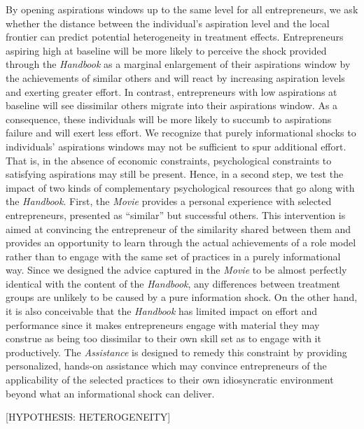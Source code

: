 \documentclass[11.5pt]{article}
\begin{document}
By opening aspirations windows up to the same level for all entrepreneurs, we ask whether the distance between the individual's aspiration level and the local frontier can predict potential heterogeneity in treatment effects. Entrepreneurs aspiring high at baseline will be more likely to perceive the shock provided through the \emph{Handbook} as a marginal enlargement of their aspirations window by the achievements of similar others and will react by increasing aspiration levels and exerting greater effort. In contrast, entrepreneurs with low aspirations at baseline will see dissimilar others migrate into their aspirations window. As a consequence, these individuals will be more likely to succumb to aspirations failure and will exert less effort. We recognize that purely informational shocks to individuals' aspirations windows may not be sufficient to spur additional effort. That is, in the absence of  economic constraints, psychological constraints to satisfying aspirations may still be present. Hence, in a second step, we test the impact of two kinds of complementary psychological resources that go along with the \emph{Handbook}. First, the \emph{Movie} provides a personal experience with selected entrepreneurs, presented as ``similar'' but successful others. This intervention is aimed at convincing the entrepreneur of the similarity shared between them and provides an opportunity to learn through the actual achievements of a role model rather than to engage with the same set of practices in a purely informational way. Since we designed the advice captured in the \emph{Movie} to be almost perfectly identical with the content of the \emph{Handbook}, any differences between treatment groups are unlikely to be caused by a pure information shock. On the other hand, it is also conceivable that the \emph{Handbook} has limited impact on effort and performance since it makes entrepreneurs engage with material they may construe as being too dissimilar to their own skill set as to engage with it productively. The \emph{Assistance} is designed to remedy this constraint by providing personalized, hands-on assistance which may convince entrepreneurs of the applicability of the selected practices to their own idiosyncratic environment beyond what an informational shock can deliver. 

[HYPOTHESIS: HETEROGENEITY]
\end{document}

